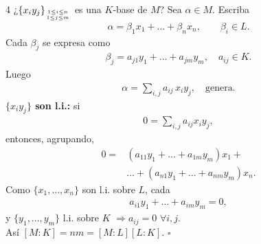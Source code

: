 \documentclass[landscape,a4paper]{article}
\begin{document}
\begin{multicols}{4}
¿$\{x_i y_j\}_{1\le i\le n\atop 1\le j\le m}$ es una $K$-base de $M$?
Sea $\alpha\in M$. Escriba
\begin{align*}
  \alpha = \beta_1 x_1 + \dots + \beta_n x_n,\qquad \beta_i\in L.
\end{align*}
Cada $\beta_j$ se expresa como
\begin{align*}
  \beta_j = a_{j1}y_1 + \dots + a_{jm}y_m, \quad a_{ij}\in K.
\end{align*}
Luego
\begin{align*}
  \alpha = \sum_{i,j} a_{ij}\,x_i y_j, \quad\text{genera.}
\end{align*}
\textbf{$\{x_i y_j\}$ son l.i.:} si
\begin{align*}
  0 = \sum_{i,j} a_{ij} x_i y_j,
\end{align*}
entonces, agrupando,
\begin{align*}
  0 = &(a_{11}y_1+\dots+a_{1m}y_m)x_1 +\\ &\dots + (a_{n1}y_1+\dots+a_{nm}y_m)x_n.
\end{align*}
Como $\{x_1,\dots,x_n\}$ son l.i. sobre $L$, cada
\begin{align*}
  a_{i1}y_1+\dots+a_{im}y_m = 0,
\end{align*}
y $\{y_1,\dots,y_m\}$ l.i. sobre $K$ $\Rightarrow a_{ij}=0$ $\forall i,j$.\\
Así $[M:K]=nm = [M:L][L:K]$. \hfill$\square$


\end{multicols}
\end{document}
